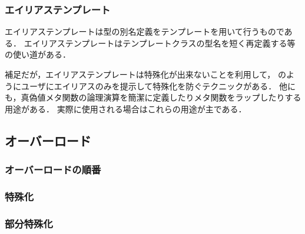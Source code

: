 
\subsubsection*{エイリアステンプレート}
エイリアステンプレートは型の別名定義をテンプレートを用いて行うものである．
エイリアステンプレートはテンプレートクラスの型名を短く再定義する等
の使い道がある．


補足だが，エイリアステンプレートは特殊化が出来ないことを利用して，
のようにユーザにエイリアスのみを提示して特殊化を防ぐテクニックがある．
他にも，真偽値メタ関数の論理演算を簡潔に定義したりメタ関数をラップしたりする用途がある．
実際に使用される場合はこれらの用途が主である．

\subsection{オーバーロード}

\subsubsection{オーバーロードの順番}

\subsubsection{特殊化}

\subsubsection{部分特殊化}
